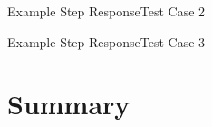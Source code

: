 \documentclass{beamer}
\begin{document}
\begin{frame}{Example Step Response}{Test Case 2}
\begin{center}
    
\end{center}
\end{frame}

\begin{frame}{Example Step Response}{Test Case 3}
\begin{center}
    
\end{center}
\end{frame}

\section{Summary}
\end{document}
